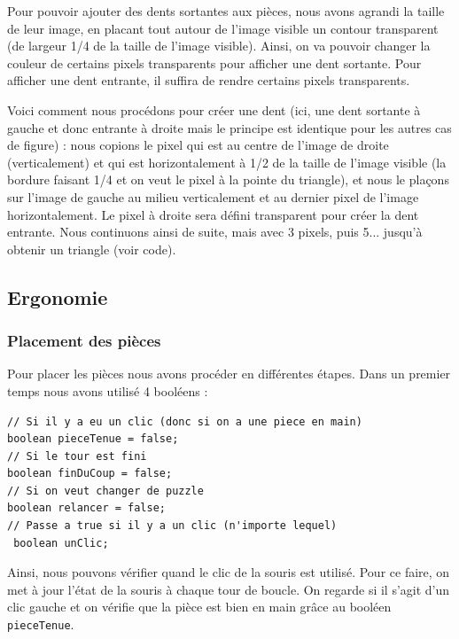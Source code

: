 \documentclass[]{article}
\newcommand{\variable}[1]{\noindent \texttt{#1}}
\begin{document}
Pour pouvoir ajouter des dents sortantes aux pièces, nous avons agrandi la taille de leur image, en placant tout autour de l'image visible un contour transparent (de largeur 1/4 de la taille de l'image visible). Ainsi, on va pouvoir changer la couleur de certains pixels transparents pour afficher une dent sortante. Pour afficher une dent entrante, il suffira de rendre certains pixels transparents.

Voici comment nous procédons pour créer une dent (ici, une dent sortante à gauche et donc entrante à droite mais le principe est identique pour les autres cas de figure) : nous copions le pixel qui est au centre de l'image de droite (verticalement) et qui est horizontalement à 1/2 de la taille de l'image visible (la bordure faisant 1/4 et on veut le pixel à la pointe du triangle), et nous le plaçons sur l'image de gauche au milieu verticalement et au dernier pixel de l'image horizontalement. Le pixel à droite sera défini transparent pour créer la dent entrante. Nous continuons ainsi de suite, mais avec 3 pixels, puis 5... jusqu'à obtenir un triangle (voir code).


\subsection{Ergonomie}
\subsubsection{Placement des pièces}

Pour placer les pièces nous avons procéder en différentes étapes. Dans un premier temps nous avons utilisé 4 booléens : 
\begin{lstlisting}
// Si il y a eu un clic (donc si on a une piece en main)
boolean pieceTenue = false;
// Si le tour est fini
boolean finDuCoup = false;
// Si on veut changer de puzzle
boolean relancer = false;
// Passe a true si il y a un clic (n'importe lequel)
 boolean unClic;
\end{lstlisting}
Ainsi, nous pouvons vérifier quand le clic de la souris est utilisé. 
Pour ce faire, on met à jour l'état de la souris à chaque tour de boucle. On regarde si il s'agit d'un clic gauche et on vérifie que la pièce est bien en main grâce au booléen \variable{pieceTenue}.
\end{document}
